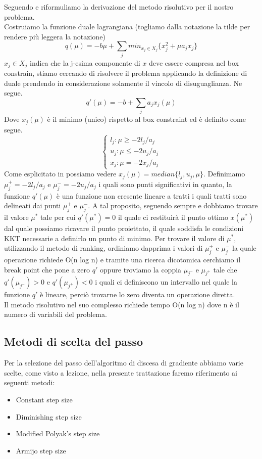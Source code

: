 \documentclass{article}
\begin{document}
Seguendo \cite{Jeong2014IndefiniteKS} e \cite{PATRIKSSON20081} riformuliamo la derivazione del metodo risolutivo per il nostro problema.\\
Costruiamo la funzione duale lagrangiana (togliamo dalla notazione la tilde per rendere più leggera la notazione)
\[q(\mu) = -b\mu + \sum_j { min_{x_j \in X_j} \{x_j^2 + \mu a_j x_j\}}\]
$x_j \in X_j$ indica che la j-esima componente di $x$ deve essere compresa nel box constrain, stiamo cercando di risolvere il problema applicando la definizione di duale prendendo in considerazione solamente il vincolo di disuguaglianza. Ne segue.
\[q'(\mu) = -b + \sum_j { a_j x_j(\mu)}\]
Dove $x_j(\mu)$ è il minimo (unico) rispetto al box constraint ed è definito come segue.
\begin{equation}
    \begin{cases}
      l_j : \mu \geq -2l_j/a_j\\
      u_j : \mu \leq -2u_j/a_j\\
      x_j : \mu = -2x_j/a_j
    \end{cases}
\end{equation}
Come esplicitato in \cite{Jeong2014IndefiniteKS} possiamo vedere $x_j(\mu) = median \{l_j, u_j, \mu\}$. Definimamo $\mu_j^+ = -2l_j/a_j$ e $\mu_j^- = -2u_j/a_j$ i quali sono punti significativi in quanto, la funzione $q'(\mu)$ è una funzione non cresente lineare a tratti i quali tratti sono delineati dai punti $\mu_j^+$ e $\mu_j^-$. A tal proposito, seguendo sempre \cite{Jeong2014IndefiniteKS} e \cite{PATRIKSSON20081} dobbiamo trovare il valore $\mu^*$ tale per cui $q'(\mu^*) = 0$ il quale ci restituirà il punto ottimo $x(\mu^*)$ dal quale possiamo ricavare il punto proiettato, il quale soddisfa le condizioni KKT necessarie a definirlo un punto di minimo. Per trovare il valore di $\mu^*$, utilizzando il metodo di ranking, ordiniamo dapprima i valori di $\mu_j^+$ e $\mu_j^-$ la quale operazione richiede O(n log n) e tramite una ricerca dicotomica cerchiamo il break point che pone a zero $q'$ oppure troviamo la coppia $\mu_{j^-}$ e $\mu_{j^+}$ tale che $q'(\mu_{j^-}) > 0$ e $q'(\mu_{j^+}) < 0$ i quali ci definiscono un intervallo nel quale la funzione $q'$ è lineare, perciò trovarne lo zero diventa un operazione diretta.\\
Il metodo risolutivo nel suo complesso richiede tempo O(n log n) dove n è il numero di variabili del problema.
\subsection{Metodi di scelta del passo}
Per la selezione del passo dell'algoritmo di discesa di gradiente abbiamo varie scelte, come visto a lezione, nella presente trattazione faremo riferimento ai seguenti metodi:
\begin{itemize}
    \item Constant step size
    \item Diminishing step size
    \item Modified Polyak's step size
    \item Armijo step size
\end{itemize}
\end{document}
